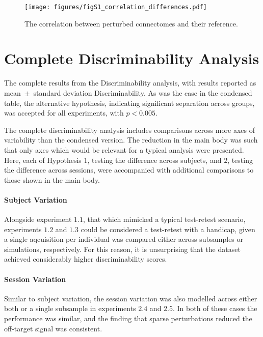 \documentclass[fleqn,10pt]{SelfArx} %
\newcommand{\new}[1]{{#1}}
\begin{document}
\begin{figure}[ht]\centering
\texttt{[image: figures/figS1\_correlation\_differences.pdf]}
\caption{The correlation between perturbed connectomes and their reference.}
\label{fig:correlation}
\end{figure}

\clearpage
\section{Complete Discriminability Analysis}
\label{supsec:discrimfull}

\begin{table*}[ht]\centering
\caption{The complete results from the Discriminability analysis, with results reported as mean~$\pm$~standard
deviation Discriminability. As was the case in the condensed table, the alternative hypothesis, indicating significant
separation across groups, was accepted for all experiments, with $p < 0.005$.}
\vspace{5pt}

\label{stab:discrim_full}
\end{table*}

The complete discriminability analysis includes comparisons across more axes of variability than the condensed version.
The reduction in the main body was such that only axes which would be relevant for a typical analysis were presented.
Here, each of Hypothesis $1$, testing the difference across subjects, and $2$, testing the difference across sessions,
were accompanied with additional comparisons to those shown in the main body.

\paragraph{Subject Variation}
Alongside experiment $1.1$, that which mimicked a typical test-retest scenario, experiments $1.2$ and $1.3$ could be
considered a test-retest with a handicap, given a single aqcuisition per individual was compared either across
subsamples or simulations, respectively. For this reason, it is unsurprising that the dataset achieved considerably
higher discriminability scores. 

\paragraph{Session Variation}
Similar to subject variation, the session variation was also modelled across either both or a single subsample \new{in
experiments $2.4$ and $2.5$}. In both of these cases the performance was similar, and the finding that \new{sparse}
perturbations reduced the off-target signal was consistent.
\end{document}
